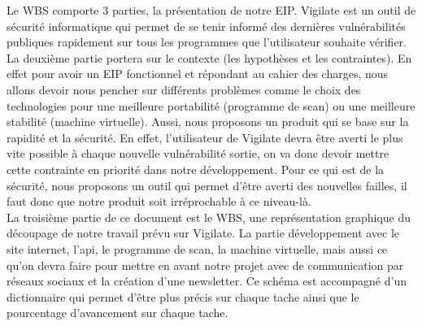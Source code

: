 Le WBS comporte 3 parties, la présentation de notre EIP. Vigilate est un outil de sécurité informatique qui permet de se tenir informé des dernières vulnérabilités publiques rapidement sur tous les programmes que l’utilisateur souhaite vérifier. La deuxième partie portera sur le contexte (les hypothèses et les contraintes). En effet pour avoir un EIP fonctionnel et répondant au cahier des charges, nous allons devoir nous pencher sur différents problèmes comme le choix des technologies pour une meilleure portabilité (programme de scan) ou une meilleure stabilité (machine virtuelle). Aussi, nous proposons un produit qui se base sur la rapidité et la sécurité. En effet, l’utilisateur de Vigilate devra être averti le plus vite possible à chaque nouvelle vulnérabilité sortie, on va donc devoir mettre cette contrainte en priorité dans notre développement. Pour ce qui est de la sécurité, nous proposons un outil qui permet d’être averti des nouvelles failles, il faut donc que notre produit soit irréprochable à ce niveau-là.\\
La troisième partie de ce document est le WBS, une représentation graphique du découpage de notre travail prévu sur Vigilate. La partie développement avec le site internet, l’api, le programme de scan, la machine virtuelle, mais aussi ce qu’on devra faire pour mettre en avant notre projet avec de communication par réseaux sociaux et la création d’une newsletter. Ce schéma est accompagné d’un dictionnaire qui permet d’être plus précis sur chaque tache ainsi que le pourcentage d’avancement sur chaque tache.